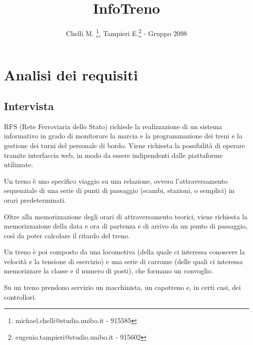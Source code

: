 \documentclass[a4paper,12pt]{report}
\title{InfoTreno}
\author{Chelli M. \thanks{michael.chelli@studio.unibo.it - 915585}, Tampieri E.\thanks{eugenio.tampieri@studio.unibo.it - 915602} - Gruppo 2098}
\begin{document}
	\maketitle
	\tableofcontents
	\chapter{Analisi dei requisiti}
	\section{Intervista}
	\par RFS (Rete Ferroviaria dello Stato) richiede la realizzazione di un sistema informativo in grado di monitorare la marcia e la programmazione dei treni e la gestione dei turni del personale di bordo. Viene richiesta la possibilità di operare tramite interfaccia web, in modo da essere indipendenti dalle piattaforme utilizzate.
	\par Un treno è uno specifico viaggio su una relazione, ovvero l'attraversamento sequenziale di una serie di punti di passaggio (scambi, stazioni, o semplici) in orari predeterminati.
	\par Oltre alla memorizzazione degli orari di attraversamento teorici, viene richiesta la memorizzazione della data e ora di partenza e di arrivo da un punto di passaggio, così da poter calcolare il ritardo del treno.
	\par Un treno è poi composto da una locomotiva (della quale ci interessa conoscere la velocità e la tensione di esercizio) e una serie di carrozze (delle quali ci interessa memorizzare la classe e il numero di posti), che formano un convoglio.
	\par Su un treno prendono servizio un macchinista, un capotreno e, in certi casi, dei controllori.
\end{document}
